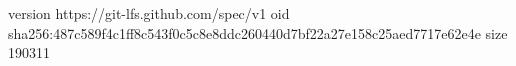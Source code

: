 version https://git-lfs.github.com/spec/v1
oid sha256:487c589f4c1ff8c543f0c5c8e8ddc260440d7bf22a27e158c25aed7717e62e4e
size 190311

